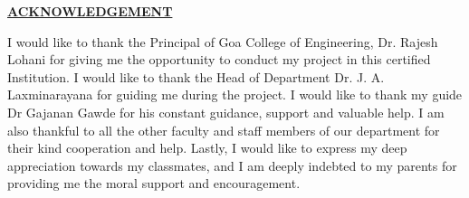 
\begin{center}
    \underline{\bfseries \huge ACKNOWLEDGEMENT}\\
    \vspace{1cm}
    \end{center}
    \noindent I would like to thank the Principal of Goa College of Engineering, Dr. Rajesh Lohani for
    giving me the opportunity to conduct my project in this certified Institution. I would like
    to thank the Head of Department Dr. J. A. Laxminarayana for guiding me during the
    project. I would like to thank my guide Dr Gajanan Gawde for his constant
    guidance, support and valuable help. I am also thankful to all the other faculty and staff
    members of our department for their kind cooperation and help. Lastly, I would like to
    express my deep appreciation towards my classmates, and I am deeply indebted to
    my parents for providing me the moral support and encouragement.
